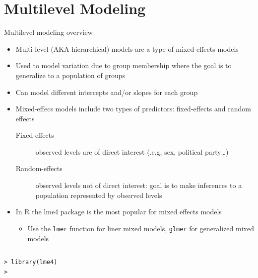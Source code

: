 \documentclass[table,smaller]{beamer}
\begin{document}
\section{Multilevel Modeling}
\label{sec-5}


\begin{frame}[fragile,label=sec-5-1]{Multilevel modeling overview}
 \begin{itemize}
\item Multi-level (AKA hierarchical) models are a type of mixed-effects models
\item Used to model variation due to group membership where the goal is to generalize to a population of groups
\item Can model different intercepts and/or slopes for each group
\item Mixed-effecs models include two types of predictors: fixed-effects and random effects
\begin{description}
\item[{Fixed-effects}] observed levels are of direct interest (.e.g, sex, political party\ldots{})
\item[{Random-effects}] observed levels not of direct interest: goal is to make inferences to a population represented by observed levels
\end{description}
\item In R the lme4 package is the most popular for mixed effects models
\begin{itemize}
\item Use the \texttt{lmer} function for liner mixed models, \texttt{glmer} for generalized mixed models
\end{itemize}
\end{itemize}

\vspace{-.5em}
\begin{columns}
\begin{block}{}
\begin{verbatim}
> library(lme4)
>
\end{verbatim}
\end{block}
\end{columns}
\vspace{.5em}
\end{frame}
\end{document}
